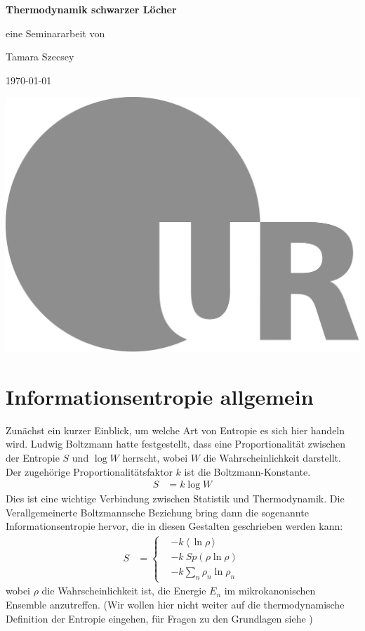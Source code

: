 \documentclass[ngerman]{scrartcl}
\newcommand{\erw}[1]{\langle {#1} \rangle}
\begin{document}
 
	\begin{titlepage}
		\begin{minipage}[c][\textheight][c]{\textwidth}
			\begin{center}
				{ \Huge \textbf{Thermodynamik schwarzer Löcher} }
				
				\vspace*{1cm}
				{\large eine Seminararbeit von}
				
				\vspace*{0.2cm}
				{\Large Tamara Szecsey}
				
				\vspace*{1cm}
				{\large \today}
				
				\vspace*{4cm}
				\hspace*{1cm} \includegraphics[height=30ex]{LOGO_UR}
			\end{center}
		\end{minipage}
	\end{titlepage}
	
\tableofcontents
\newpage

\section{Informationsentropie allgemein}
Zunächst ein kurzer Einblick, um welche Art von Entropie es sich hier handeln wird. Ludwig Boltzmann hatte festgestellt, dass eine Proportionalität zwischen der Entropie $S$ und $\log W$ herrscht, wobei $W$ die Wahrscheinlichkeit darstellt. Der zugehörige Proportionalitätsfaktor $k$ ist die Boltzmann-Konstante.
	\begin{align}
		S &= k \log W
	\end{align}
Dies ist eine wichtige Verbindung zwischen Statistik und Thermodynamik. 
Die Verallgemeinerte Boltzmannsche Beziehung bring dann die sogenannte Informationsentropie hervor, die in diesen Gestalten geschrieben werden kann:	
	\begin{align} \label{Informationsentropie}
		S &=
		\left\{
		\begin{aligned}
		&- k ~\erw{\,\ln \rho\,} \\
		&-k~ Sp(\rho \ln \rho) \\
		&-k \sum_n \rho_n \ln \rho_n
		\end{aligned}
		\right.
	\end{align}
wobei $\rho$ die Wahrscheinlichkeit ist, die Energie $E_n$ im mikrokanonischen Ensemble anzutreffen. 
(Wir wollen hier nicht weiter auf die thermodynamische Definition der Entropie eingehen, für Fragen zu den Grundlagen siehe \cite{Brenig})
\end{document}
